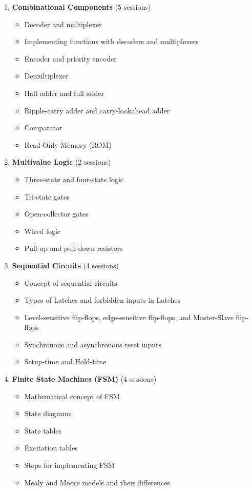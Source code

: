 \documentclass[12pt]{article}
\begin{document}
\begin{enumerate}
    \item \textbf{Combinational Components} (5 sessions)
        \begin{itemize}
            \item Decoder and multiplexer
            \item Implementing functions with decoders and multiplexers
            \item Encoder and priority encoder
            \item Demultiplexer
            \item Half adder and full adder
            \item Ripple-carry adder and carry-lookahead adder
            \item Comparator
            \item Read-Only Memory (ROM)
        \end{itemize}

    \item \textbf{Multivalue Logic} (2 sessions)
        \begin{itemize}
            \item Three-state and four-state logic
            \item Tri-state gates
            \item Open-collector gates
            \item Wired logic
            \item Pull-up and pull-down resistors
        \end{itemize}

    \item \textbf{Sequential Circuits} (4 sessions)
        \begin{itemize}
            \item Concept of sequential circuits
            \item Types of Latches and forbidden inputs in Latches
            \item Level-sensitive flip-flops, edge-sensitive flip-flops, and Master-Slave flip-flops
            \item Synchronous and asynchronous reset inputs
            \item Setup-time and Hold-time
        \end{itemize}

    \item \textbf{Finite State Machines (FSM)} (4 sessions)
        \begin{itemize}
            \item Mathematical concept of FSM
            \item State diagrams
            \item State tables
            \item Excitation tables
            \item Steps for implementing FSM
            \item Mealy and Moore models and their differences
        \end{itemize}


\end{enumerate}
\end{document}
